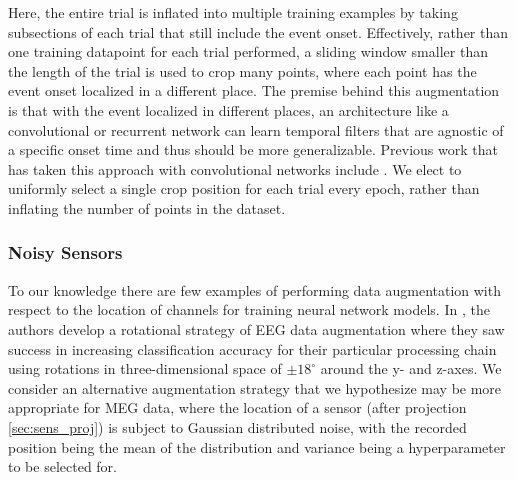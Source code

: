 \documentclass[utf8]{frontiersSCNS} %
\begin{document}
Here, the entire trial is inflated into multiple training examples by taking subsections of each trial that still include the event onset. Effectively, rather than one training datapoint for each trial performed, a sliding window smaller than the length of the trial is used to crop many points, where each point has the event onset localized in a different place. The premise behind this augmentation is that with the event localized in different places, an architecture like a convolutional or recurrent network can learn temporal filters that are agnostic of a specific onset time and thus should be more generalizable. Previous work that has taken this approach with convolutional networks include \cite{Schirrmeister2017, Sun}. We elect to uniformly select a single crop position for each trial every epoch, rather than inflating the number of points in the dataset.



\subsubsection{Noisy Sensors}

To our knowledge there are few examples of performing data augmentation with respect to the location of channels for training neural network models. In \cite{Krell2017}, the authors develop a rotational strategy of EEG data augmentation where they saw success in increasing classification accuracy for their particular processing chain using rotations in three-dimensional space of $\pm 18^{\circ}$ around the y- and z-axes. We consider an alternative augmentation strategy that we hypothesize may be more appropriate for MEG data, where the location of a sensor (after projection \ref{sec:sens_proj}) is subject to Gaussian distributed noise, with the recorded position being the mean of the distribution and variance being a hyperparameter to be selected for.
\end{document}
